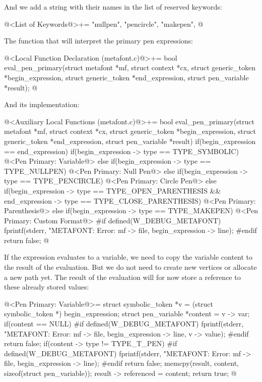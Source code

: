And we add a string with their names in the list of reserved keywords:

\iniciocodigo
@<List of Keywords@>+=
"nullpen", "pencircle", "makepen",
@
\fimcodigo

The function that will interpret the primary pen expressions:

\iniciocodigo
@<Local Function Declaration (metafont.c)@>+=
bool eval_pen_primary(struct metafont *mf, struct context *cx,
                      struct generic_token *begin_expression,
                      struct generic_token *end_expression,
                      struct pen_variable *result);
@
\fimcodigo

And its implementation:

\iniciocodigo
@<Auxiliary Local Functions (metafont.c)@>+=
bool eval_pen_primary(struct metafont *mf, struct context *cx,
                      struct generic_token *begin_expression,
                      struct generic_token *end_expression,
                      struct pen_variable *result){
  if(begin_expression == end_expression){
    if(begin_expression -> type == TYPE_SYMBOLIC){
      @<Pen Primary: Variable@>
    }
    else if(begin_expression -> type == TYPE_NULLPEN){
      @<Pen Primary: Null Pen@>
    }
    else if(begin_expression -> type == TYPE_PENCIRCLE){
      @<Pen Primary: Circle Pen@>
    }
  }
  else{
    if(begin_expression -> type == TYPE_OPEN_PARENTHESIS &&
      end_expression -> type == TYPE_CLOSE_PARENTHESIS){
      @<Pen Primary: Parenthesis@>
    }
    else if(begin_expression -> type == TYPE_MAKEPEN){
      @<Pen Primary: Custom Format@>
    }
  }
#if defined(W_DEBUG_METAFONT)
  fprintf(stderr, "METAFONT: Error: %
          mf -> file, begin_expression -> line);
#endif
  return false;
}
@
\fimcodigo

If the expression evaluates to a variable, we need to copy the
variable content to the result of the evaluation. But we do not need
to create new vertices or allocate a new path yet. The result of the
evaluation will for now store a reference to these already stored
values:

\iniciocodigo
@<Pen Primary: Variable@>=
struct symbolic_token *v = (struct symbolic_token *) begin_expression;
struct pen_variable *content = v -> var;
if(content == NULL){
#if defined(W_DEBUG_METAFONT)
  fprintf(stderr, "METAFONT: Error: %
          mf -> file, begin_expression -> line, v -> value);
#endif
  return false;
}
if(content -> type != TYPE_T_PEN){
#if defined(W_DEBUG_METAFONT)
  fprintf(stderr, "METAFONT: Error: %
          mf -> file, begin_expression -> line);
#endif
  return false;
}
memcpy(result, content, sizeof(struct pen_variable));
result -> referenced = content;
return true;
@
\fimcodigo

